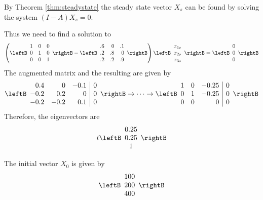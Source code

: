 \begin{solution}
By Theorem \ref{thm:steadystate} the steady state vector $X_s$ can be found by solving the system $(I-A)X_s = 0$. 

Thus we need to find a solution to
\begin{equation*}
\left( \leftB
\begin{array}{rrr}
1 & 0 & 0 \\
0 & 1 & 0 \\
0 & 0 & 1
\end{array}
\rightB -\leftB
\begin{array}{rrr}
.6 & 0 & .1 \\
.2 & .8 & 0 \\
.2 & .2 & .9
\end{array}
\rightB \right) \leftB
\begin{array}{c}
x_{1s} \\
x_{2s}\\
x_{3s}
\end{array}
\rightB =\leftB
\begin{array}{c}
0 \\
0 \\
0
\end{array}
\rightB
\end{equation*}
The augmented matrix and the resulting \rref \;are given by 
\begin{equation*}
\leftB
\begin{array}{rrr|r}
0.4 & 0 & -0.1 & 0 \\
-0.2 & 0.2 & 0 & 0 \\
-0.2 & -0.2 & 0.1 & 0
\end{array}
\rightB
\rightarrow \cdots \rightarrow
\leftB
\begin{array}{rrr|r}
1 & 0 & -0.25 & 0 \\
0 & 1 & -0.25 & 0 \\
0 & 0 & 0 & 0
\end{array}
\rightB
\end{equation*}
Therefore, the eigenvectors are
\begin{equation*}
t\leftB
\begin{array}{c}
0.25 \\
0.25 \\
1
\end{array}
\rightB
\end{equation*}

The initial vector $X_0$ is given by 
\begin{equation*}
\leftB
\begin{array}{r}
100 \\
200 \\
400
\end{array}
\rightB
\end{equation*}


\end{solution}
